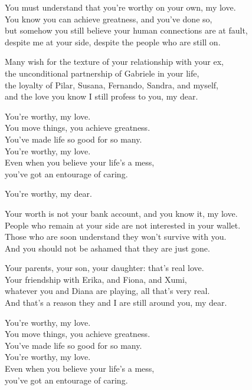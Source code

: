 \begin{lyrics}
You must understand that you're worthy on your own, my love.\\
You know you can achieve greatness, and you've done so,\\
but somehow you still believe your human connections are at fault,\\
despite me at your side, despite the people who are still on.

Many wish for the texture of your relationship with your ex,\\
the unconditional partnership of Gabriele in your life,\\
the loyalty of Pilar, Susana, Fernando, Sandra, and myself,\\
and the love you know I still profess to you, my dear.

You're worthy, my love.\\
You move things, you achieve greatness.\\
You've made life so good for so many.\\
You're worthy, my love.\\
Even when you believe your life's a mess,\\
you've got an entourage of caring.

You're worthy, my dear.

Your worth is not your bank account, and you know it, my love.\\
People who remain at your side are not interested in your wallet.\\
Those who are soon understand they won't survive with you.\\
And you should not be ashamed that they are just gone.

Your parents, your son, your daughter: that's real love.\\
Your friendship with Erika, and Fiona, and Xumi,\\
whatever you and Diana are playing, all that's very real.\\
And that's a reason they and I are still around you, my dear.

You're worthy, my love.\\
You move things, you achieve greatness.\\
You've made life so good for so many.\\
You're worthy, my love.\\
Even when you believe your life's a mess,\\
you've got an entourage of caring.


\end{lyrics}
